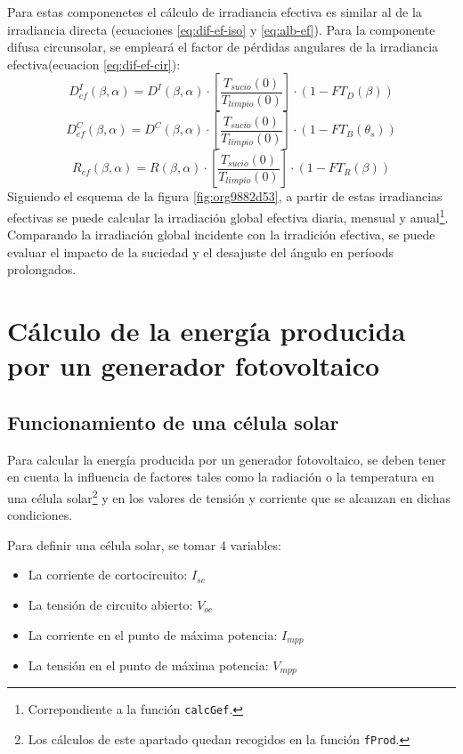Para estas componenetes el cálculo de irradiancia efectiva es similar al de la irradiancia directa (ecuaciones \ref{eq:dif-ef-iso} y \ref{eq:alb-ef}). Para la componente difusa circunsolar, se empleará el factor de pérdidas angulares de la irradiancia efectiva(ecuacion \ref{eq:dif-ef-cir}):
\begin{equation}
D_{ef}^I(\beta ,\alpha)=D^I(\beta ,\alpha)\cdot[\frac{T_{sucio}(0)}{T_{limpio}(0)}]\cdot (1-FT_D(\beta))
\label{eq:dif-ef-iso}
\end{equation}
\begin{equation}
D_{ef}^C(\beta ,\alpha)=D^C(\beta ,\alpha)\cdot[\frac{T_{sucio}(0)}{T_{limpio}(0)}]\cdot (1-FT_B(\theta_s))
\label{eq:dif-ef-cir}
\end{equation}
\begin{equation}
R_{ef}(\beta ,\alpha)=R(\beta ,\alpha)\cdot[\frac{T_{sucio}(0)}{T_{limpio}(0)}]\cdot (1-FT_R(\beta))
\label{eq:alb-ef}
\end{equation}
Siguiendo el esquema de la figura \ref{fig:org9882d53}, a partir de estas irradiancias efectivas se puede calcular la irradiación global efectiva diaria, mensual y anual\footnote{Correpondiente a la función \texttt{calcGef}.}. Comparando la irradiación global incidente con la irradición efectiva, se puede evaluar el impacto de la suciedad y el desajuste del ángulo en períoods prolongados.

\section{Cálculo de la energía producida por un generador fotovoltaico}
\label{sec:orgf058aad}
\label{sec:calculo-energia-producida-generador}

\subsection{Funcionamiento de una célula solar}
\label{sec:org1172b6b}
\label{subsec:funcionamiento-celula-solar}
Para calcular la energía producida por un generador fotovoltaico, se deben tener en cuenta la influencia de factores tales como la radiación o la temperatura en una célula solar\footnote{Los cálculos de este apartado quedan recogidos en la función \texttt{fProd}.} y en los valores de tensión y corriente que se alcanzan en dichas condiciones.

Para definir una célula solar, se tomar 4 variables:
\begin{itemize}
\item La corriente de cortocircuito: \(I_{sc}\)
\item La tensión de circuito abierto: \(V_{oc}\)
\item La corriente en el punto de máxima potencia: \(I_{mpp}\)
\item La tensión en el punto de máxima potencia: \(V_{mpp}\)
\end{itemize}

